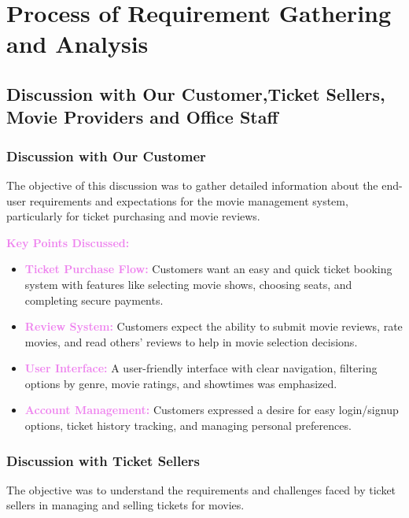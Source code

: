 \documentclass[a4paper,12pt]{article}  %
\renewcommand{\textbf}[1]{\textcolor{violet}{\bfseries #1}}
\begin{document}
\clearpage





    \section{Process of Requirement Gathering and Analysis}




\subsection{Discussion with Our Customer,Ticket Sellers, Movie Providers and Office Staff}
\subsubsection*{Discussion with Our Customer}
The objective of this discussion was to gather detailed information about the end-user requirements and expectations for the movie management system, particularly for ticket purchasing and movie reviews.

\textbf{Key Points Discussed:}
\begin{itemize}
    \item \textbf{Ticket Purchase Flow:} Customers want an easy and quick ticket booking system with features like selecting movie shows, choosing seats, and completing secure payments.
    \item \textbf{Review System:} Customers expect the ability to submit movie reviews, rate movies, and read others' reviews to help in movie selection decisions.
    \item \textbf{User Interface:} A user-friendly interface with clear navigation, filtering options by genre, movie ratings, and showtimes was emphasized.
    \item \textbf{Account Management:} Customers expressed a desire for easy login/signup options, ticket history tracking, and managing personal preferences.
\end{itemize}

\subsubsection*{Discussion with Ticket Sellers}
The objective was to understand the requirements and challenges faced by ticket sellers in managing and selling tickets for movies.
\end{document}
